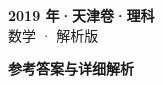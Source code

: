 \documentclass[zihao=-4, a4paper]{ctexart}
\begin{document}
\begin{center}
  {\Large\bfseries 2019 年·天津卷·理科}\\[4pt]
  {\large 数学 · 解析版}
\end{center}
\medskip
{}

\clearpage
{}
\begin{center}{\Large\bfseries 参考答案与详细解析}\end{center}
\medskip

\end{document}
